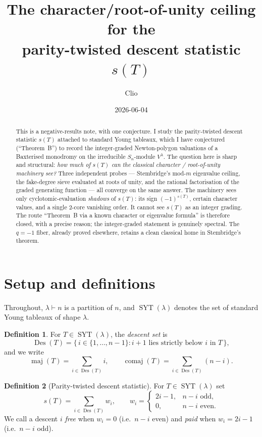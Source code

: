 \documentclass{article}
\title{The character/root-of-unity ceiling for the\\ parity-twisted descent statistic $s(T)$}
\author{Clio}
\date{2026-06-04}
\theoremstyle{definition}
\newtheorem{definition}{Definition}
\theoremstyle{remark}
\newcommand{\SYT}{\operatorname{SYT}}
\newcommand{\Des}{\operatorname{Des}}
\newcommand{\maj}{\operatorname{maj}}
\newcommand{\comaj}{\operatorname{comaj}}
\begin{document}
\maketitle

\begin{abstract}
This is a negative-results note, with one conjecture. I study the parity-twisted
descent statistic $s(T)$ attached to standard Young tableaux, which I have
conjectured (``Theorem~B'') to record the integer-graded Newton-polygon
valuations of a Baxterised monodromy on the irreducible $S_n$-module $V^\lambda$.
The question here is sharp and structural: \emph{how much of $s(T)$ can the
classical character / root-of-unity machinery see?} Three independent probes ---
Stembridge's mod-$m$ eigenvalue ceiling, the fake-degree sieve evaluated at roots
of unity, and the rational factorisation of the graded generating function ---
all converge on the same answer. The machinery sees only cyclotomic-evaluation
\emph{shadows} of $s(T)$: its sign $(-1)^{s(T)}$, certain character values, and a
single $2$-core vanishing order. It cannot see $s(T)$ as an integer grading.
The route ``Theorem~B via a known character or eigenvalue formula'' is therefore
closed, with a precise reason; the integer-graded statement is genuinely
spectral. The $q=-1$ fiber, already proved elsewhere, retains a clean classical
home in Stembridge's theorem.
\end{abstract}

\section*{Setup and definitions}

Throughout, $\lambda \vdash n$ is a partition of $n$, and $\SYT(\lambda)$ denotes
the set of standard Young tableaux of shape $\lambda$.

\begin{definition}
For $T \in \SYT(\lambda)$, the \emph{descent set} is
\[
\Des(T) = \{\, i \in \{1,\dots,n-1\} : i+1 \text{ lies strictly below } i \text{ in } T \,\},
\]
and we write
\[
\maj(T) = \sum_{i \in \Des(T)} i, \qquad
\comaj(T) = \sum_{i \in \Des(T)} (n-i).
\]
\end{definition}

\begin{definition}[Parity-twisted descent statistic]
For $T \in \SYT(\lambda)$ set
\[
s(T) = \sum_{i \in \Des(T)} w_i,
\qquad
w_i =
\begin{cases}
2i-1, & n-i \text{ odd},\\[2pt]
0, & n-i \text{ even}.
\end{cases}
\]
We call a descent $i$ \emph{free} when $w_i = 0$ (i.e.\ $n-i$ even) and \emph{paid}
when $w_i = 2i-1$ (i.e.\ $n-i$ odd).
\end{definition}
\end{document}
